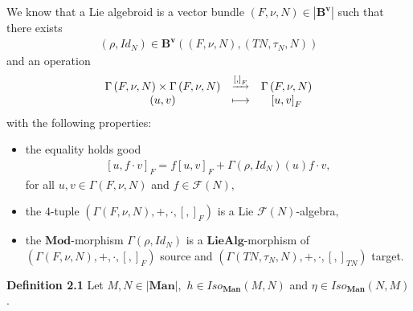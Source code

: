 \documentclass[11pt]{article}
\begin{document}
We know that a Lie algebroid is a vector bundle $\left( F,\nu ,N\right) \in
\left\vert \mathbf{B}^{\mathbf{v}}\right\vert $ such that there exists
\begin{equation*}
\begin{array}{c}
\left( \rho ,Id_{N}\right) \in \mathbf{B}^{\mathbf{v}}\left( \left( F,\nu
,N\right) ,\left( TN,\tau _{N},N\right) \right)%
\end{array}%
\end{equation*}%
and an operation
\begin{equation*}
\begin{array}{ccc}
\Gamma \left( F,\nu ,N\right) \times \Gamma \left( F,\nu ,N\right) & ^{%
\underrightarrow{\,\left[ ,\right] _{F}\,}} & \Gamma \left( F,\nu ,N\right)
\\
\left( u,v\right) & \longmapsto & \left[ u,v\right] _{F}%
\end{array}%
\end{equation*}%
with the following properties:

\begin{itemize}
\item[$LA_{1}$.] the equality holds good
\begin{equation*}
\begin{array}{c}
\left[ u,f\cdot v\right] _{F}=f\left[ u,v\right] _{F}+\Gamma \left( \rho
,Id_{N}\right) \left( u\right) f\cdot v,%
\end{array}%
\end{equation*}%
for all $u,v\in \Gamma \left( F,\nu ,N\right) $ and $f\in \mathcal{F}\left(
N\right) ,$

\item[$LA_{2}$.] the $4$-tuple $\left( \Gamma \left( F,\nu ,N\right)
,+,\cdot ,\left[ ,\right] _{F}\right) $ is a Lie $\mathcal{F}\left( N\right)
$-algebra$,$

\item[$LA_{3}$.] the $\mathbf{Mod}$-morphism $\Gamma \left( \rho
,Id_{N}\right) $ is a $\mathbf{LieAlg}$-morphism of $\left( \Gamma \left(
F,\nu ,N\right) ,+,\cdot ,\left[ ,\right] _{F}\right) $ source and $\left(
\Gamma \left( TN,\tau _{N},N\right) ,+,\cdot ,\left[ ,\right] _{TN}\right) $
target.
\end{itemize}

\textbf{Definition 2.1 }Let $M,N\in \left\vert \mathbf{Man}\right\vert ,$ $%
h\in Iso_{\mathbf{Man}}\left( M,N\right) $ and $\eta \in Iso_{\mathbf{Man}%
}\left( N,M\right) $.
\end{document}
